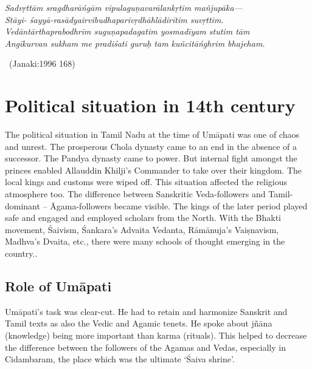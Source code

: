 \begin{myquote}
\textit{Sadvṛttām sragdharāńgām vipulaguṇavarālankṛtim mañjupāka—}\\\textit{Stāyi- śayyā-rasādyairvibudhaparivṛdhāhlādirītim suvṛttim.}\\\textit{Vedāntārthaprabodhrīm suguṇapadagatim yosmadīyam stutim tām}\\\textit{Angīkurvan sukham me pradiśati guruḥ tam kuñcitāńghrim bhajeham.}

~\hfill (Janaki:1996 168)
\end{myquote}

\newpage


\section*{Political situation in 14th century}

\vskip -4pt

The political situation in Tamil Nadu at the time of Umāpati was one of chaos and unrest. The prosperous Chola dynasty came to an end in the absence of a successor. The Pandya dynasty came to power. But internal fight amongst the princes enabled Allauddin Khilji’s Commander to take over their kingdom. The local kings and customs were wiped off. This situation affected the religious atmosphere too. The difference between Sanskritic Veda-followers and Tamil-dominant – Āgama-followers became visible. The kings of the later period played safe and engaged and employed scholars from the North. With the Bhakti movement, Śaivism, Śankara’s Advaita Vedanta, Rāmānuja’s Vaiṣnavism, Madhva’s Dvaita, etc., there were many schools of thought emerging in the country..

\subsection*{Role of Umāpati}

\vskip -4pt

Umāpati’s task was clear-cut. He had to retain and harmonize Sanskrit and Tamil texts as also the Vedic and Agamic tenets. He spoke about jñāna (knowledge) being more important than karma (rituals). This helped to decrease the difference between the followers of the Agamas and Vedas, especially in Cidambaram, the place which was the ultimate ‘Śaiva shrine’.

